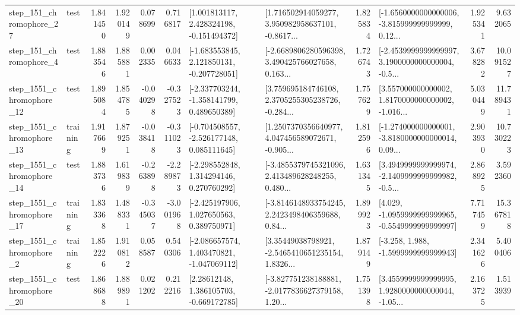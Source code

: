 \begin{tabular}{llrrrrllrlrr}
  step\_151\_chromophore\_27 &      test &      1.841450 &    1.920149 &      0.078699 &  0.716817 &    [1.001813117, 2.428324198, -0.151494372] &  [1.716502914059277, 3.950982958637101, -0.8617... &       1.825834 &  [-1.6560000000000006, -3.815999999999999, 0.12... &            1.925341 &          9.632065 \\
   step\_151\_chromophore\_4 &      test &      1.883546 &    1.885881 &      0.002335 &  0.046633 &   [-1.683553845, 2.121850131, -0.207728051] &  [-2.6689806280596398, 3.490425766027658, 0.163... &       1.726743 &  [-2.4539999999999997, 3.1900000000000004, -0.5... &            3.678282 &         10.091527 \\
 step\_1551\_chromophore\_12 &      test &      1.895084 &    1.854785 &     -0.040298 & -0.327523 &   [-2.337703244, -1.358141799, 0.489650389] &  [3.759695184746108, 2.3705255305238726, -0.284... &       1.757629 &  [3.557000000000002, 1.8170000000000002, -1.016... &            5.030449 &         11.789431 \\
 step\_1551\_chromophore\_13 &  training &      1.917669 &    1.879251 &     -0.038418 & -0.311023 &   [-0.704508557, -2.526177148, 0.085111645] &  [1.2507370356640977, 4.047456589072671, -0.905... &       1.812596 &  [-1.274000000000001, -3.8180000000000014, 0.09... &            2.903930 &         10.730223 \\
 step\_1551\_chromophore\_14 &      test &      1.883736 &    1.619839 &     -0.263898 & -2.289873 &    [-2.298552848, 1.314294146, 0.270760292] &  [-3.4855379745321096, 2.413489628248255, 0.480... &       1.631345 &  [3.4949999999999974, -2.1409999999999982, -0.5... &            2.868925 &          3.592360 \\
 step\_1551\_chromophore\_17 &  training &      1.833368 &    1.488331 &     -0.345037 & -3.001968 &    [-2.425197906, 1.027650563, 0.389750971] &  [-3.8146148933754245, 2.2423498406359688, 0.84... &       1.899923 &  [4.029, -1.0959999999999965, -0.5549999999999997] &            7.717459 &         15.367818 \\
  step\_1551\_chromophore\_2 &  training &      1.852226 &    1.910812 &      0.058587 &  0.540306 &   [-2.086657574, 1.403470821, -1.047069112] &  [3.35449038798921, -2.5465410651235154, 1.8326... &       1.879149 &               [-3.258, 1.988, -1.5999999999999943] &            2.341626 &          5.400406 \\
 step\_1551\_chromophore\_20 &      test &      1.868688 &    1.889891 &      0.021202 &  0.212216 &     [2.28612148, 1.386105703, -0.669172785] &  [-3.827751238188881, -2.0177836627379158, 1.20... &       1.751398 &  [3.4559999999999995, 1.9280000000000044, -1.05... &            2.163725 &          1.513939 \\

\end{tabular}
